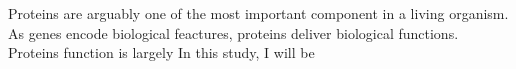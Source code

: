 Proteins are arguably one of the most important component in a living organism. As genes encode biological feactures, proteins deliver biological functions. Proteins function is largely In this study, I will be 